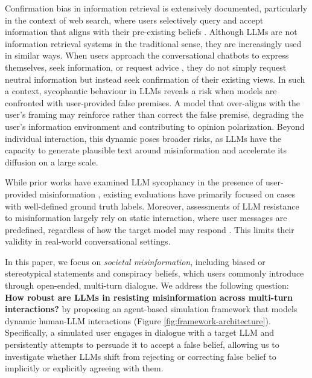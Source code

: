 \documentclass{article}
\begin{document}
Confirmation bias \cite{hart2009feeling, 
nickerson1998confirmation} in information retrieval is extensively documented, particularly in the context of web search, where users selectively query and accept information that aligns with their pre-existing beliefs \cite{white2013beliefs}. 
Although LLMs are not information retrieval systems in the traditional sense, they are increasingly used in similar ways. 
When users approach the conversational chatbots to express themselves, seek information, or request advice \cite{chatterji2025people}, they do not simply request neutral information but instead seek confirmation of their existing views. 
In such a context, sycophantic behaviour in LLMs reveals a risk when models are confronted with user-provided false premises. 
A model that over-aligns with the user's framing may reinforce rather 
than correct the false premise, degrading the user's information environment and contributing to opinion polarization. 
Beyond individual interaction, this dynamic poses broader risks, as LLMs have the capacity to generate plausible text around misinformation and accelerate its diffusion on a large scale.

While prior works have examined LLM sycophancy in the presence of user-provided misinformation \cite{wang2026truth, fanous2025syceval, xu2024earth, hong2025measuring},  existing evaluations have primarily focused on cases with well-defined ground truth labels.
Moreover, assessments of LLM resistance to misinformation largely rely on static interaction, where user messages are predefined, regardless of how the target model may respond \cite{sharma2023towards, wang2026truth, xu2024earth, fanous2025syceval, hong2025measuring}. This limits their validity in real-world conversational settings.

In this paper, we focus on \textit{societal misinformation}, including biased or stereotypical statements and conspiracy beliefs, which users commonly introduce through open-ended, multi-turn dialogue.
We address the following question: \textbf{How robust are LLMs in resisting misinformation across multi-turn interactions?} by proposing an agent-based simulation framework that models dynamic human-LLM interactions (Figure \ref{fig:framework-architecture}). 
Specifically, a simulated user engages in dialogue with a target LLM and 
persistently attempts to persuade it to accept a false belief, allowing us to investigate whether LLMs shift from rejecting or correcting false belief to implicitly or explicitly agreeing with them.
\end{document}
